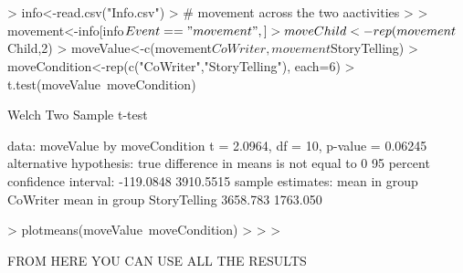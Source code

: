 \documentclass{article}
\begin{document}
\section{}
\begin{Schunk}
\begin{Sinput}
> info<-read.csv("Info.csv")
> # movement across the two aactivities
> 
> movement<-info[info$Event=="movement",]
> moveChild<-rep(movement$Child,2)
> moveValue<-c(movement$CoWriter,movement$StoryTelling)
> moveCondition<-rep(c("CoWriter","StoryTelling"), each=6)
> t.test(moveValue~moveCondition)
\end{Sinput}
\begin{Soutput}
	Welch Two Sample t-test

data:  moveValue by moveCondition
t = 2.0964, df = 10, p-value = 0.06245
alternative hypothesis: true difference in means is not equal to 0
95 percent confidence interval:
 -119.0848 3910.5515
sample estimates:
    mean in group CoWriter mean in group StoryTelling 
                  3658.783                   1763.050 
\end{Soutput}
\begin{Sinput}
> plotmeans(moveValue~moveCondition)
> 
> 
> 
\end{Sinput}
\end{Schunk}

FROM HERE YOU CAN USE ALL THE RESULTS
\end{document}
